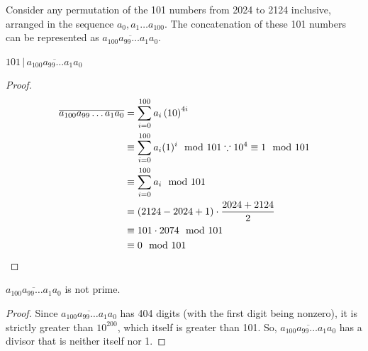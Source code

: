 \documentclass[10pt]{../usamts}
\begin{document}
\begin{solution}{2}

Consider any permutation of the 101 numbers from 2024 to 2124 inclusive, arranged in the sequence $a_0, a_1 \dots a_{100}$. The concatenation of these 101 numbers can be represented as $\overline{a_{100} a_{99} \dots a_{1} a_{0}}$.

\begin{claim}
    $101\,|\,\overline{a_{100} a_{99} \dots a_{1} a_{0}}$
\end{claim}
\begin{proof}
    
    \begin{align*}
    \overline{a_{100} a_{99} \dots a_{1} a_{0}}
        &= \sum_{i=0}^{100} a_i \left( 10 \right)^{4i} \\
        &\equiv \sum_{i=0}^{100} a_i (1)^i \mod 101 \because 10^4 \equiv 1 \mod 101\\
        &\equiv \sum_{i=0}^{100} a_i \mod 101 \\
        &\equiv (2124 - 2024 + 1) \cdot \frac{2024 + 2124}{2} \\
        &\equiv 101 \cdot 2074 \mod 101 \\
        &\equiv 0 \mod 101
    \end{align*}
\end{proof}
\begin{claim}
    $\overline{a_{100} a_{99} \dots a_{1} a_{0}}$ is not prime.
\end{claim}
\begin{proof}
    Since $\overline{a_{100} a_{99} \dots a_{1} a_{0}}$ has 404 digits (with the first digit being nonzero), it is strictly greater than $10^{200}$, which itself is greater than 101. So, $\overline{a_{100} a_{99} \dots a_{1} a_{0}}$ has a divisor that is neither itself nor 1.
\end{proof}

\end{solution}
\end{document}
